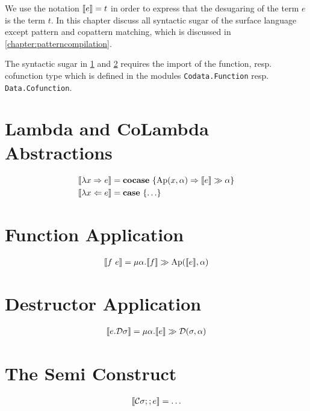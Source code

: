 We use the notation $\llbracket e \rrbracket = t$ in order to express that the desugaring of the term $e$ is the term $t$. 
In this chapter discuss all syntactic sugar of the surface language except pattern and copattern matching, which is discussed in \cref{chapter:patterncompilation}.

The syntactic sugar in \cref{sec:desugaring:lambda} and \cref{sec:desugaring:funapp} requires the import of the function, resp. cofunction type which is defined in the
modules \texttt{Codata.Function} resp. \texttt{Data.Cofunction}.

\section{Lambda and CoLambda Abstractions}
\label{sec:desugaring:lambda}

\begin{align*}
    \llbracket \lambda x \Rightarrow e \rrbracket &= \mathbf{cocase}\ \{  \text{Ap}(x,\alpha) \Rightarrow \llbracket e \rrbracket \gg \alpha  \} \\
    \llbracket \lambda x \Leftarrow e \rrbracket &= \mathbf{case}\ \{ \ldots \}
\end{align*}

\section{Function Application}
\label{sec:desugaring:funapp}

\begin{align*}
    \llbracket f\ e \rrbracket = \mu \alpha. \llbracket f \rrbracket \gg \text{Ap}(\llbracket e \rrbracket,\alpha)
\end{align*}

\section{Destructor Application}
\label{sec:desugaring:dtorapp}

\begin{align*}
    \llbracket e.\mathcal{D}\sigma \rrbracket = \mu \alpha. \llbracket e \rrbracket \gg \mathcal{D}(\sigma,\alpha)
\end{align*}

\section{The Semi Construct}
\label{sec:desugaring:semi}

\begin{align*}
    \llbracket \mathcal{C}\sigma ;; e \rrbracket = \ldots
\end{align*}